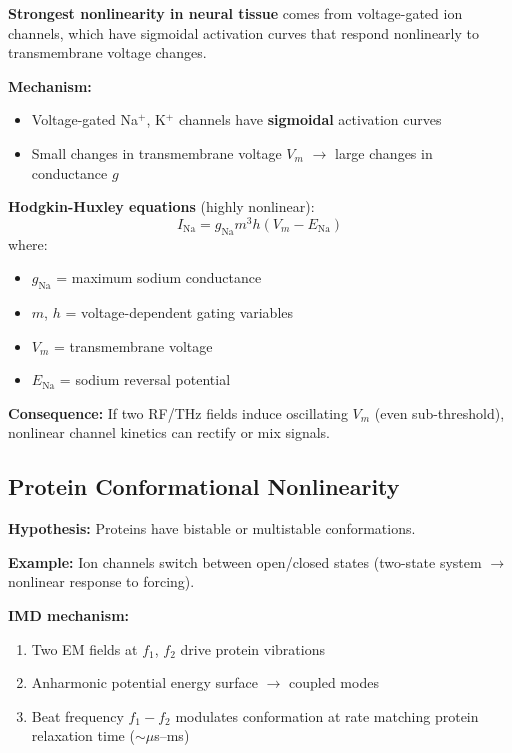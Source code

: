 \begin{keyconcept}
\textbf{Strongest nonlinearity in neural tissue} comes from voltage-gated ion channels, which have sigmoidal activation curves that respond nonlinearly to transmembrane voltage changes.
\end{keyconcept}

\textbf{Mechanism:}
\begin{itemize}
\item Voltage-gated Na$^+$, K$^+$ channels have \textbf{sigmoidal} activation curves
\item Small changes in transmembrane voltage $V_m$ $\rightarrow$ large changes in conductance $g$
\end{itemize}

\textbf{Hodgkin-Huxley equations} (highly nonlinear):
\begin{equation}
\label{eq:hodgkin-huxley}
I_{\text{Na}} = g_{\text{Na}} m^3 h (V_m - E_{\text{Na}})
\end{equation}
where:
\begin{itemize}
\item $g_{\text{Na}}$ = maximum sodium conductance
\item $m$, $h$ = voltage-dependent gating variables
\item $V_m$ = transmembrane voltage
\item $E_{\text{Na}}$ = sodium reversal potential
\end{itemize}

\textbf{Consequence:} If two RF/THz fields induce oscillating $V_m$ (even sub-threshold), nonlinear channel kinetics can rectify or mix signals.

\subsection{Protein Conformational Nonlinearity}

\textbf{Hypothesis:} Proteins have bistable or multistable conformations.

\textbf{Example:} Ion channels switch between open/closed states (two-state system $\rightarrow$ nonlinear response to forcing).

\textbf{IMD mechanism:}
\begin{enumerate}
\item Two EM fields at $f_1$, $f_2$ drive protein vibrations
\item Anharmonic potential energy surface $\rightarrow$ coupled modes
\item Beat frequency $f_1 - f_2$ modulates conformation at rate matching protein relaxation time ($\sim\mu$s--ms)
\end{enumerate}

